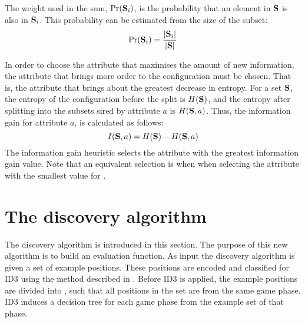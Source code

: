 \documentclass[twoside,11pt]{article}
\begin{document}
The weight used in the sum, $\mbox{Pr}({\bf S}_i)$, is the probability that an element in ${\bf S}$ is also in ${\bf S}_i$.  This probability can be estimated from the size of the subset:
\begin{equation}
\mbox{Pr}({\bf S}_i) = \frac{|{\bf S}_i|}{|{\bf S}|}
\label{eq:subset_probability}
\end{equation}

In order to choose the attribute that maximises the amount of new information, the attribute that brings more order to the configuration must be chosen.  That is, the attribute that brings about the greatest decrease in entropy. For a set ${\bf S}$, the entropy of the configuration before the split is $H({\bf S})$, and the entropy after splitting into the subsets sired by attribute $a$ is $H({\bf S},a)$. Thus, the information gain for attribute $a$, is calculated as follows:
\begin{equation}
I({\bf S},a) = H({\bf S}) - H({\bf S},a)
\label{eq:gain}
\end{equation}
The information gain heuristic selects the attribute with the greatest information gain value. Note that an equivalent selection is when when selecting the attribute with the smallest value for . 


\section{The discovery algorithm}
\label{sec:discovery_algorithm}
The discovery algorithm is introduced in this section.  The purpose of this new algorithm is to build an evaluation function. As input the discovery algorithm is given a set of example positions. These positions are encoded and classified for ID3 using the method described in .
Before ID3 is applied, the example positions are divided into , such that all positions in the set are from the same game phase.  ID3 induces a decision tree for each game phase from the example set of that phase.   
\end{document}
